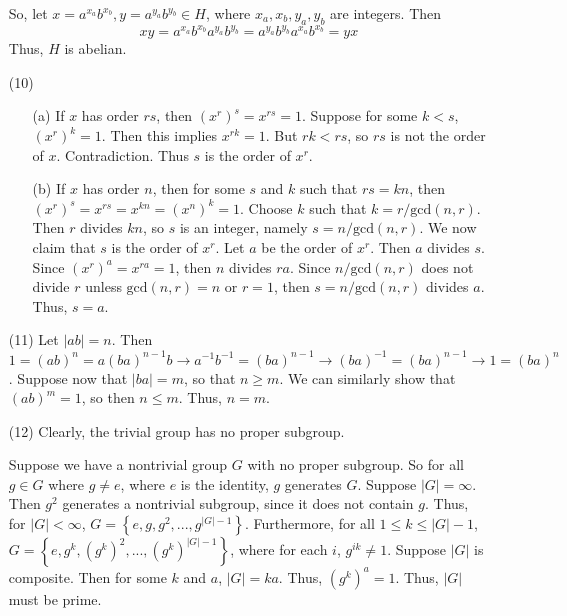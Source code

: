 \begin{itemize}
So, let $x = a^{x_a}b^{x_b}, y = a^{y_a}b^{y_b} \in H$, where $x_a, x_b, y_a, y_b$ are integers. Then
$$xy = a^{x_a}b^{x_b}a^{y_a}b^{y_b} = a^{y_a}b^{y_b}a^{x_a}b^{x_b} = yx$$
Thus, $H$ is abelian.
\item[(10)]
\begin{itemize}
\item[(a)]
If $x$ has order $rs$, then $(x^r)^s = x^{rs} = 1$. Suppose for some $k < s$, $(x^r)^k = 1$. Then this implies $x^{rk} = 1$. But $rk < rs$, so $rs$ is not the order of $x$. Contradiction. Thus $s$ is the order of $x^r$.
\item[(b)]
If $x$ has order $n$, then for some $s$ and $k$ such that $rs = kn$, then $(x^r)^s = x^{rs} = x^{kn} = (x^n)^k = 1$. Choose $k$ such that $k = r/\text{gcd}(n, r)$. Then $r$ divides $kn$, so $s$ is an integer, namely $s = n/\text{gcd}(n,r)$. We now claim that $s$ is the order of $x^r$. Let $a$ be the order of $x^r$. Then $a$ divides $s$. Since $(x^r)^a = x^{ra} = 1$, then $n$ divides $ra$. Since $n/\text{gcd}(n,r)$ does not divide $r$ unless $\text{gcd}(n,r) = n$ or $r = 1$, then $s = n/\text{gcd}(n,r)$ divides $a$. Thus, $s = a$.
\end{itemize}
\item[(11)]
Let $|ab| = n$. Then $1 = (ab)^n = a(ba)^{n-1}b \rightarrow a^{-1}b^{-1} = (ba)^{n-1} \rightarrow (ba)^{-1} = (ba)^{n-1} \rightarrow 1 = (ba)^n$. Suppose now that $|ba| = m$, so that $n \geq m$. We can similarly show that $(ab)^m = 1$, so then $n \leq m$. Thus, $n = m$.
\item[(12)]
Clearly, the trivial group has no proper subgroup.

Suppose we have a nontrivial group $G$ with no proper subgroup. So for all $g \in G$ where $g \neq e$, where $e$ is the identity, $g$ generates $G$. Suppose $|G| = \infty$. Then $g^2$ generates a nontrivial subgroup, since it does not contain $g$. Thus, for $|G| < \infty$, $G = \left\lbrace e, g, g^2, ..., g^{|G| - 1} \right\rbrace$. Furthermore, for all $1 \leq k \leq |G| - 1$, $G = \left\lbrace e, g^k, (g^k)^2, ..., (g^k)^{|G|-1} \right\rbrace$, where for each $i$, $g^{ik} \neq 1$. Suppose $|G|$ is composite. Then for some $k$ and $a$, $|G| = ka$. Thus, $(g^k)^a = 1$. Thus, $|G|$ must be prime.


\end{itemize}
